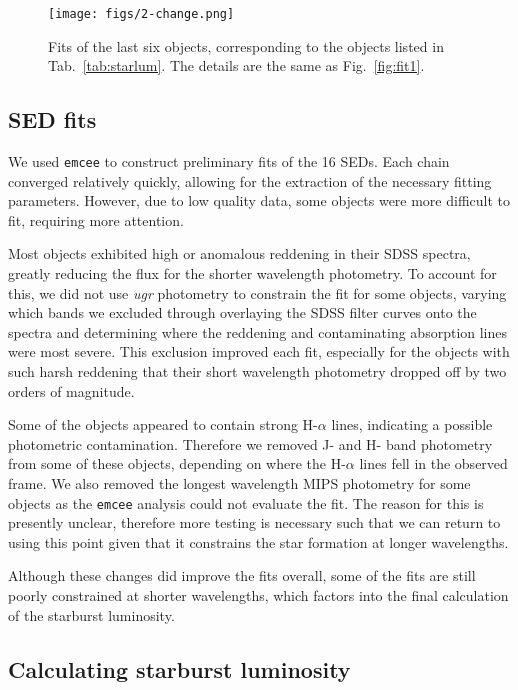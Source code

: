 \begin{figure*}
  \centering
  \texttt{[image: figs/2-change.png]}
  \caption{Fits of the last six objects, corresponding to the objects listed in Tab.~\ref{tab:starlum}. The details are the same as 
           Fig.~\ref{fig:fit1}.} 
           \label{fig:fit2}
\end{figure*}


\subsection{SED fits}
\label{sec:fits}

We used \texttt{emcee} to construct preliminary fits of the 16 SEDs. Each 
chain converged relatively quickly, allowing for the extraction of the necessary fitting parameters. However, due to low quality data, 
some objects were more difficult to fit, requiring more attention. 

Most objects exhibited high or anomalous reddening in their SDSS spectra, greatly reducing the flux for the shorter wavelength 
photometry. To account for this, we did not use \textit{ugr} photometry to constrain the fit for some objects, 
varying which bands we excluded through 
overlaying the SDSS filter curves onto the spectra and determining where the reddening and contaminating absorption lines were most severe. 
This exclusion improved each fit, 
especially for the objects with such harsh reddening that their short wavelength photometry dropped off by two orders of magnitude. 

Some of the objects appeared to contain strong H-$\alpha$ lines, indicating a possible photometric contamination. Therefore 
we removed J- and H- band photometry from some of these objects, depending on where the H-$\alpha$ lines fell in the observed frame. 
We also removed the longest wavelength MIPS photometry for some objects as the \texttt{emcee} analysis could not evaluate the fit. 
The reason for this is presently unclear, therefore more testing is necessary such that we can return to using this point given 
that it constrains the star formation at longer wavelengths.

Although these changes did improve the fits overall, some of the fits are still poorly constrained at shorter wavelengths, which 
factors into the final calculation of the starburst luminosity. 

\subsection{Calculating starburst luminosity}
\label{sec:starlum}

